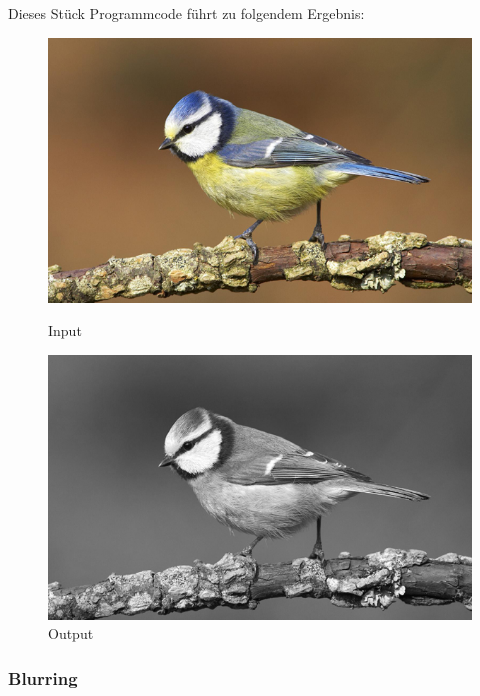 Dieses Stück Programmcode führt zu folgendem Ergebnis:

\begin{figure}[htb]
    \centering
    \begin{minipage}[t]{0.45\linewidth}
        \centering
        \includegraphics[width=\linewidth]{pics/bildverarbeitungsalgos/input.png}
        \caption{Input}
        \label{maai:grayscaling:input}
    \end{minipage}
    \hfill
    \begin{minipage}[t]{0.45\linewidth}
        \centering
        \includegraphics[width=\linewidth]{pics/bildverarbeitungsalgos/grayscaling_output.png}
        \caption{Output}
        \label{maai:grayscaling:output}
    \end{minipage}
\end{figure}

\subsubsection{Blurring}\label{maai:blurring}

